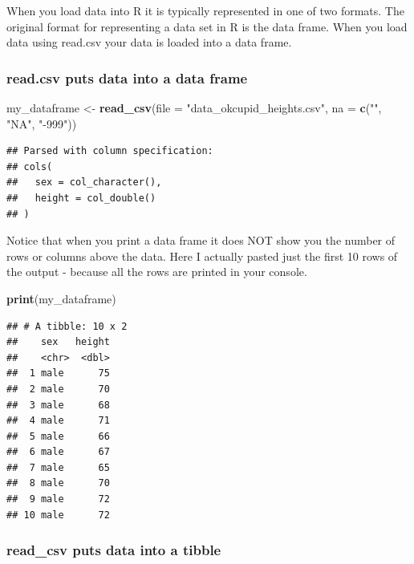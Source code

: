 \documentclass[
]{krantz}
\makeatletter
\newenvironment{Shaded}{\begin{snugshade}}{\end{snugshade}}
\newcommand{\DataTypeTok}[1]{\textcolor[rgb]{0.27,0.27,0.27}{#1}}
\newcommand{\KeywordTok}[1]{\textcolor[rgb]{0.27,0.27,0.27}{\textbf{#1}}}
\newcommand{\NormalTok}[1]{#1}
\newcommand{\StringTok}[1]{\textcolor[rgb]{0.5,0.5,0.5}{#1}}
\newenvironment{kframe}{%
\medskip{}
\setlength{\fboxsep}{.8em}
 \def\at@end@of@kframe{}%
 \ifinner\ifhmode%
  \def\at@end@of@kframe{\end{minipage}}%
  \begin{minipage}{\columnwidth}%
 \fi\fi%
 \def\FrameCommand##1{\hskip\@totalleftmargin \hskip-\fboxsep
 \colorbox{shadecolor}{##1}\hskip-\fboxsep
     \hskip-\linewidth \hskip-\@totalleftmargin \hskip\columnwidth}%
 \MakeFramed {\advance\hsize-\width
   \@totalleftmargin\z@ \linewidth\hsize
   \@setminipage}}%
 {\par\unskip\endMakeFramed%
 \at@end@of@kframe}
\renewenvironment{Shaded}{\begin{kframe}}{\end{kframe}}
\makeatother
\begin{document}
When you load data into R it is typically represented in one of two formats. The original format for representing a data set in R is the data frame. When you load data using read.csv your data is loaded into a data frame.

\hypertarget{read.csv-puts-data-into-a-data-frame}{%
\subsubsection{read.csv puts data into a data frame}\label{read.csv-puts-data-into-a-data-frame}}

\begin{Shaded}
\begin{Highlighting}[]
\NormalTok{my_dataframe <-}\StringTok{ }\KeywordTok{read_csv}\NormalTok{(}\DataTypeTok{file =} \StringTok{"data_okcupid_heights.csv"}\NormalTok{, }
                    \DataTypeTok{na =} \KeywordTok{c}\NormalTok{(}\StringTok{""}\NormalTok{, }\StringTok{"NA"}\NormalTok{, }\StringTok{"-999"}\NormalTok{))}
\end{Highlighting}
\end{Shaded}

\begin{verbatim}
## Parsed with column specification:
## cols(
##   sex = col_character(),
##   height = col_double()
## )
\end{verbatim}

Notice that when you print a data frame it does NOT show you the number of rows or columns above the data. Here I actually pasted just the first 10 rows of the output - because all the rows are printed in your console.

\begin{Shaded}
\begin{Highlighting}[]
\KeywordTok{print}\NormalTok{(my_dataframe)}
\end{Highlighting}
\end{Shaded}

\begin{verbatim}
## # A tibble: 10 x 2
##    sex   height
##    <chr>  <dbl>
##  1 male      75
##  2 male      70
##  3 male      68
##  4 male      71
##  5 male      66
##  6 male      67
##  7 male      65
##  8 male      70
##  9 male      72
## 10 male      72
\end{verbatim}

\hypertarget{read_csv-puts-data-into-a-tibble}{%
\subsubsection{read\_csv puts data into a tibble}\label{read_csv-puts-data-into-a-tibble}}
\end{document}
